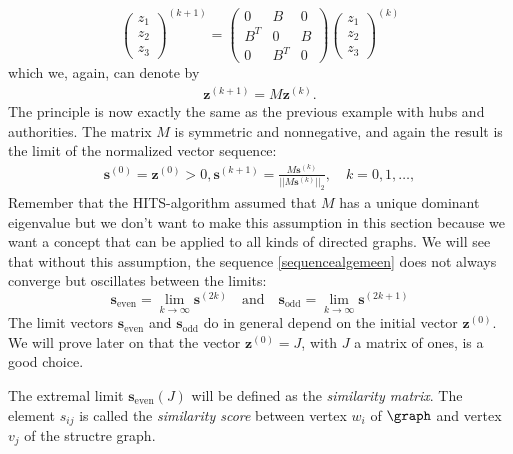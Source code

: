 \documentclass[a4paper,11pt]{report}
\begin{document}
$$\begin{pmatrix}
z_1\\
z_2\\
z_3
\end{pmatrix}^{(k+1)} = \begin{pmatrix}
0 & B & 0\\
B^T & 0 & B\\
0 & B^T & 0
\end{pmatrix}\begin{pmatrix}
z_1\\
z_2\\
z_3
\end{pmatrix}^{(k)}   $$ 
which we, again, can denote by 
\begin{eqnarray}\label{kleinecompact}
 \mathbf{z}^{(k+1)} = M\mathbf{z}^{(k)}.
  \end{eqnarray}
 The principle is now exactly the 
same as the previous example with hubs and authorities. The matrix $M$ is 
symmetric and nonnegative, and again the result is the limit of the normalized vector sequence:
\begin{eqnarray}\label{sequencealgemeen}
  \mathbf{s}^{(0)} = \mathbf{z}^{(0)} > 0, \mathbf{s}^{(k+1)} = \frac{M\mathbf{s}^{(k)}}{||M\mathbf{s}^{(k)}||_2}, \quad k = 
  0,1,\ldots,
\end{eqnarray}
Remember that the HITS-algorithm assumed that $M$ has a unique dominant 
eigenvalue but we don't want to make this assumption in this section because we 
want a concept that can be applied to all kinds of directed graphs. We will see 
that without this assumption, the sequence \ref{sequencealgemeen} does not 
always converge but oscillates between the limits:
$$\mathbf{s}_\text{even}= \lim_{k\to\infty}\mathbf{s}^{(2k)}\quad\text{and}\quad \mathbf{s}_{\text{odd}}= \lim_{k\to\infty}\mathbf{s}^{(2k+1)}$$ 
The limit vectors $\mathbf{s}_\text{even}$ and $\mathbf{s}_\text{odd}$ do in 
general depend on the initial vector $\mathbf{z}^{(0)}$. We will prove later on that the vector 
$\mathbf{z}^{(0)}=J$, with $J$ a matrix of ones,
is a good choice.

The  
extremal limit  $\mathbf{s}_{\text{even}}(J)$ will be defined as the \textit{similarity 
matrix}. The element $s_{ij}$ is called the \textit{similarity score}
between vertex $w_i$ of $\graph$ and vertex $v_j$ of the structre graph. 
\end{document}
